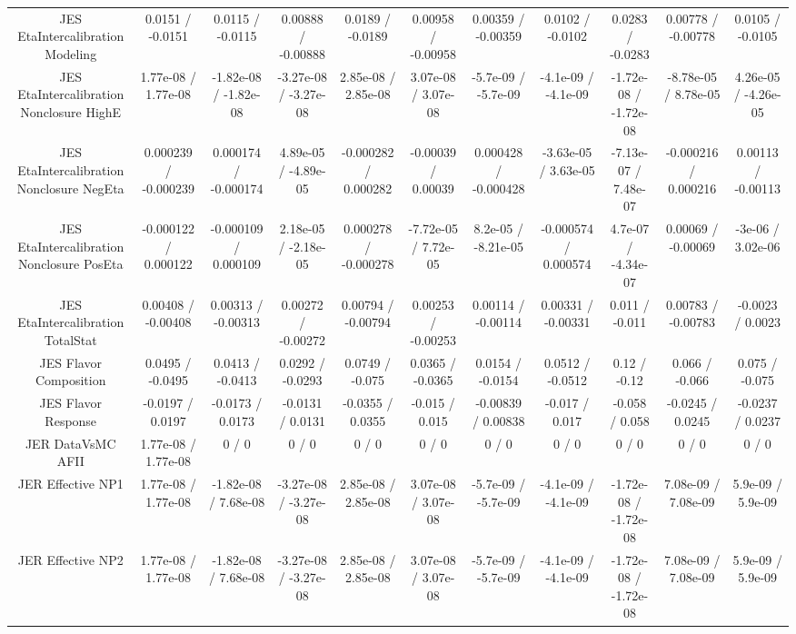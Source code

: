 \begin{table}[htbp]
\begin{center}
\begin{tabular}{|c|c|c|c|c|c|c|c|c|c|c|}
  JES EtaIntercalibration Modeling & 0.0151 / -0.0151 & 0.0115 / -0.0115 & 0.00888 / -0.00888 & 0.0189 / -0.0189 & 0.00958 / -0.00958 & 0.00359 / -0.00359 & 0.0102 / -0.0102 & 0.0283 / -0.0283 & 0.00778 / -0.00778 & 0.0105 / -0.0105 \\ 
  JES EtaIntercalibration Nonclosure HighE & 1.77e-08 / 1.77e-08 & -1.82e-08 / -1.82e-08 & -3.27e-08 / -3.27e-08 & 2.85e-08 / 2.85e-08 & 3.07e-08 / 3.07e-08 & -5.7e-09 / -5.7e-09 & -4.1e-09 / -4.1e-09 & -1.72e-08 / -1.72e-08 & -8.78e-05 / 8.78e-05 & 4.26e-05 / -4.26e-05 \\ 
  JES EtaIntercalibration Nonclosure NegEta & 0.000239 / -0.000239 & 0.000174 / -0.000174 & 4.89e-05 / -4.89e-05 & -0.000282 / 0.000282 & -0.00039 / 0.00039 & 0.000428 / -0.000428 & -3.63e-05 / 3.63e-05 & -7.13e-07 / 7.48e-07 & -0.000216 / 0.000216 & 0.00113 / -0.00113 \\ 
  JES EtaIntercalibration Nonclosure PosEta & -0.000122 / 0.000122 & -0.000109 / 0.000109 & 2.18e-05 / -2.18e-05 & 0.000278 / -0.000278 & -7.72e-05 / 7.72e-05 & 8.2e-05 / -8.21e-05 & -0.000574 / 0.000574 & 4.7e-07 / -4.34e-07 & 0.00069 / -0.00069 & -3e-06 / 3.02e-06 \\ 
  JES EtaIntercalibration TotalStat & 0.00408 / -0.00408 & 0.00313 / -0.00313 & 0.00272 / -0.00272 & 0.00794 / -0.00794 & 0.00253 / -0.00253 & 0.00114 / -0.00114 & 0.00331 / -0.00331 & 0.011 / -0.011 & 0.00783 / -0.00783 & -0.0023 / 0.0023 \\ 
  JES Flavor Composition & 0.0495 / -0.0495 & 0.0413 / -0.0413 & 0.0292 / -0.0293 & 0.0749 / -0.075 & 0.0365 / -0.0365 & 0.0154 / -0.0154 & 0.0512 / -0.0512 & 0.12 / -0.12 & 0.066 / -0.066 & 0.075 / -0.075 \\ 
  JES Flavor Response & -0.0197 / 0.0197 & -0.0173 / 0.0173 & -0.0131 / 0.0131 & -0.0355 / 0.0355 & -0.015 / 0.015 & -0.00839 / 0.00838 & -0.017 / 0.017 & -0.058 / 0.058 & -0.0245 / 0.0245 & -0.0237 / 0.0237 \\ 
  JER DataVsMC AFII & 1.77e-08 / 1.77e-08 & 0 / 0 & 0 / 0 & 0 / 0 & 0 / 0 & 0 / 0 & 0 / 0 & 0 / 0 & 0 / 0 & 0 / 0 \\ 
  JER Effective NP1 & 1.77e-08 / 1.77e-08 & -1.82e-08 / 7.68e-08 & -3.27e-08 / -3.27e-08 & 2.85e-08 / 2.85e-08 & 3.07e-08 / 3.07e-08 & -5.7e-09 / -5.7e-09 & -4.1e-09 / -4.1e-09 & -1.72e-08 / -1.72e-08 & 7.08e-09 / 7.08e-09 & 5.9e-09 / 5.9e-09 \\ 
  JER Effective NP2 & 1.77e-08 / 1.77e-08 & -1.82e-08 / 7.68e-08 & -3.27e-08 / -3.27e-08 & 2.85e-08 / 2.85e-08 & 3.07e-08 / 3.07e-08 & -5.7e-09 / -5.7e-09 & -4.1e-09 / -4.1e-09 & -1.72e-08 / -1.72e-08 & 7.08e-09 / 7.08e-09 & 5.9e-09 / 5.9e-09 \\ 

\end{tabular}
\end{center}
\end{table}
